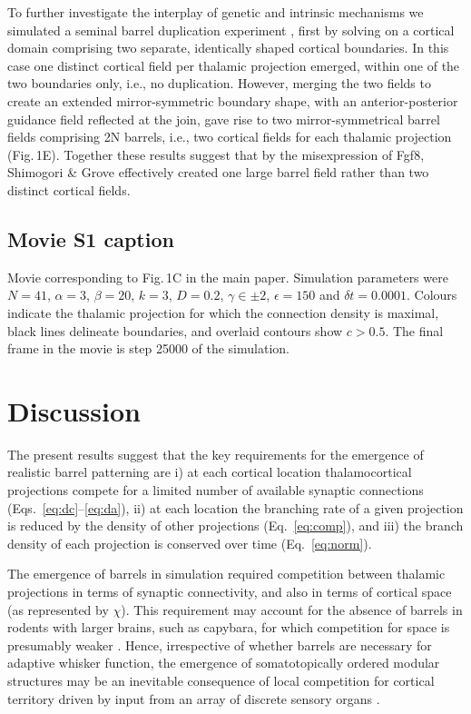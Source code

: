 \documentclass[9pt,twocolumn,twoside,lineno]{pnas-new}
\begin{document}
To further investigate the interplay of genetic and intrinsic mechanisms we simulated a seminal barrel duplication experiment \cite{shimogori_fibroblast_2005},  first by solving on a cortical domain comprising two separate, identically shaped cortical boundaries. In this case one distinct cortical field per thalamic projection emerged, within one of the two boundaries only, i.e., no duplication. However, merging the two fields to create an extended mirror-symmetric boundary shape, with an anterior-posterior guidance field reflected at the join, gave rise to two mirror-symmetrical barrel fields comprising 2N barrels, i.e., two cortical fields for each thalamic projection (Fig.\,1E). Together these results suggest that by the misexpression of Fgf8, Shimogori \& Grove \citep{shimogori_fibroblast_2005} effectively created one large barrel field rather than two distinct cortical fields.

\subsection*{Movie S1 caption}

Movie corresponding to Fig.\,1C in the main paper. Simulation parameters were
$N=41$, $\alpha=3$, $\beta=20$, $k=3$, $D=0.2$, $\gamma\in\pm 2$,
$\epsilon=150$ and $\delta{t}=0.0001$. Colours indicate the thalamic
projection for which the connection density is maximal, black lines delineate
boundaries, and overlaid contours show $c>0.5$. The final frame in the movie
is step 25000 of the simulation.

\section*{Discussion}

The present results suggest that the key requirements for the emergence of realistic barrel patterning are i) at each cortical location thalamocortical projections compete for a limited number of available synaptic connections (Eqs.~\ref{eq:dc}--\ref{eq:da}), ii) at each location the branching rate of a given projection is reduced by the density of other projections (Eq.~\ref{eq:comp}), and iii) the branch density of each projection is conserved over time (Eq.~\ref{eq:norm}).

The emergence of barrels in simulation required competition between thalamic projections in terms of synaptic connectivity, and also in terms of cortical space (as represented by $\chi$). This requirement may account for the absence of barrels in rodents with larger brains, such as capybara, for which competition for space is presumably weaker \citep{Woolsey1975}. Hence, irrespective of whether barrels are necessary for adaptive whisker function, the emergence of somatotopically ordered modular structures may be an inevitable consequence of local competition for cortical territory driven by input from an array of discrete sensory organs \citep{purves_iterated_1992}.
\end{document}
